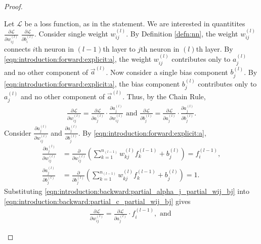 \begin{proof}
\setcounter{step}{0}
\begin{step}
Let $\mathcal{L}$ be a loss function, as in the statement. We are interested in quantitites $\frac{\partial \mathcal{L}}{\partial w_{ij}^{(l)}}$  $\frac{\partial \mathcal{L}}{\partial b_{i}^{(l)}}$. Consider single weight $w_{ij}^{(l)}$. By Definition \ref{defn:nn}, the weight $w_{ij}^{(l)}$ connects $i$th neuron in $(l - 1)$th layer to $j$th neuron in $(l)$th layer. By \ref{eqn:introduction:forward:explicit:a}, the weight $w_{ij}^{(l)}$ contributes only to $a_j^{(l)}$ and no other component of $\vec{a}^{(l)}$. Now consider a single bias component $b_{j}^{(l)}$. By \ref{eqn:introduction:forward:explicit:a}, the bias component $b_{j}^{(l)}$ contributes only to $a_j^{(l)}$ and no other component of $\vec{a}^{(l)}$. Thus, by the Chain Rule, \begin{align}
    \label{eqn:introduction:backward:partial_c_partial_wij_bj}
    \frac{\partial \mathcal{L}}{\partial w_{ij}^{(l)}} = \frac{\partial \mathcal{L}}{\partial a_{j}^{(l)}} \cdot  \frac{\partial a_{j}^{(l)}}{\partial w_{ij}^{(l)}} \text{ and }     \frac{\partial \mathcal{L}}{\partial b_{j}^{(l)}} = \frac{\partial \mathcal{L}}{\partial a_{j}^{(l)}} \cdot  \frac{\partial a_{j}^{(l)}}{\partial b_{j}^{(l)}}.
\end{align}
Consider $\frac{\partial a_{j}^{(l)}}{\partial w_{ij}^{(l)}}$ and $\frac{\partial a_{j}^{(l)}}{\partial b_{j}^{(l)}}$. By \ref{eqn:introduction:forward:explicit:a}, \begin{align}
    \label{eqn:introduction:backward:partial_alpha_j_partial_wij_bj}
    \frac{\partial a_{j}^{(l)}}{\partial w_{ij}^{(l)}} &= \frac{\partial}{\partial w_{ij}^{(l)}} \left (  \sum_{k = 1}^{n_{(l-1)}} w_{kj}^{(l)} f_{k}^{(l-1)} + b^{(l)}_j \right ) = f_{i}^{(l-1)}, \\
    \frac{\partial a_{j}^{(l)}}{\partial b_{j}^{(l)}} &= \frac{\partial}{\partial b_{j}^{(l)}} \left (  \sum_{k = 1}^{n_{(l-1)}} w_{kj}^{(l)} f_{k}^{(l-1)} + b^{(l)}_j \right ) = 1.
\end{align}
Substituting \ref{eqn:introduction:backward:partial_alpha_j_partial_wij_bj} into \ref{eqn:introduction:backward:partial_c_partial_wij_bj} gives \begin{align}
    \label{eqn:introduction:backward:partial_c_partial_wij_bij_2}
    \frac{\partial \mathcal{L}}{\partial w_{ij}^{(l)}} = \frac{\partial \mathcal{L}}{\partial a_{j}^{(l)}} \cdot f_{i}^{(l-1)}, \text{ and }

\end{align}
\end{step}
\end{proof}
